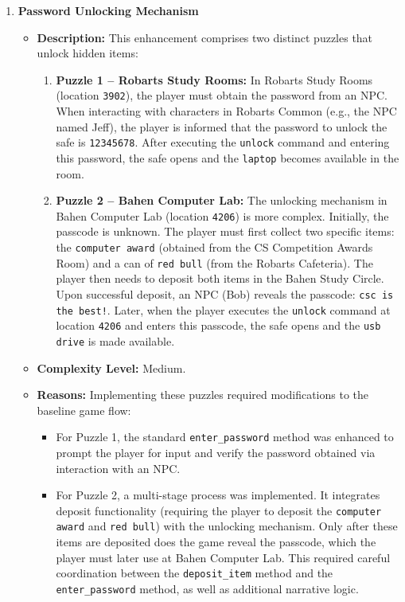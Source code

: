 \documentclass[11pt]{article}
\begin{document}
\begin{enumerate}
    
    \item \textbf{Password Unlocking Mechanism}
    \begin{itemize}
        \item \textbf{Description:}  
        This enhancement comprises two distinct puzzles that unlock hidden items:
        \begin{enumerate}
            \item \textbf{Puzzle 1 – Robarts Study Rooms:}  
            In Robarts Study Rooms (location \texttt{3902}), the player must obtain the password from an NPC. When interacting with characters in Robarts Common (e.g., the NPC named Jeff), the player is informed that the password to unlock the safe is \texttt{12345678}. After executing the \texttt{unlock} command and entering this password, the safe opens and the \texttt{laptop} becomes available in the room.
            \item \textbf{Puzzle 2 – Bahen Computer Lab:}  
            The unlocking mechanism in Bahen Computer Lab (location \texttt{4206}) is more complex. Initially, the passcode is unknown. The player must first collect two specific items: the \texttt{computer award} (obtained from the CS Competition Awards Room) and a can of \texttt{red bull} (from the Robarts Cafeteria). The player then needs to deposit both items in the Bahen Study Circle. Upon successful deposit, an NPC (Bob) reveals the passcode: \texttt{csc is the best!}. Later, when the player executes the \texttt{unlock} command at location \texttt{4206} and enters this passcode, the safe opens and the \texttt{usb drive} is made available.
        \end{enumerate}
        \item \textbf{Complexity Level:} Medium.
        \item \textbf{Reasons:}  
        Implementing these puzzles required modifications to the baseline game flow:
        \begin{itemize}
            \item For Puzzle 1, the standard \texttt{enter\_password} method was enhanced to prompt the player for input and verify the password obtained via interaction with an NPC.
            \item For Puzzle 2, a multi-stage process was implemented. It integrates deposit functionality (requiring the player to deposit the \texttt{computer award} and \texttt{red bull}) with the unlocking mechanism. Only after these items are deposited does the game reveal the passcode, which the player must later use at Bahen Computer Lab. This required careful coordination between the \texttt{deposit\_item} method and the \texttt{enter\_password} method, as well as additional narrative logic.

\end{itemize}
\end{itemize}
\end{enumerate}
\end{document}
